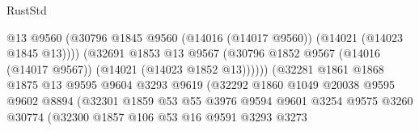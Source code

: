 \begin{lexlean}{RustStd}
\begin{coremodule}
                                            @13
                                            @9560
                                            (@30796
                                              @1845
                                              @9560
                                              (@14016 (@14017 @9560))
                                              (@14021 (@14023 @1845 @13))))
                                          (@32691
                                            @1853
                                            @13
                                            @9567
                                            (@30796
                                              @1852
                                              @9567
                                              (@14016 (@14017 @9567))
                                              (@14021 (@14023 @1852 @13))))))
                                      (@32281
                                        @1861
                                        @1868
                                        @1875
                                        @13
                                        @9595
                                        @9604
                                        @3293
                                        @9619
                                        (@32292
                                          @1860
                                          @1049
                                          @20038
                                          @9595
                                          @9602
                                          @8894
                                          (@32301
                                            @1859
                                            @53
                                            @55
                                            @3976
                                            @9594
                                            @9601
                                            @3254
                                            @9575
                                            @3260
                                            @30774
                                            (@32300
                                              @1857
                                              @106
                                              @53
                                              @16
                                              @9591
                                              @3293
                                              @3273

\end{coremodule}
\end{lexlean}
